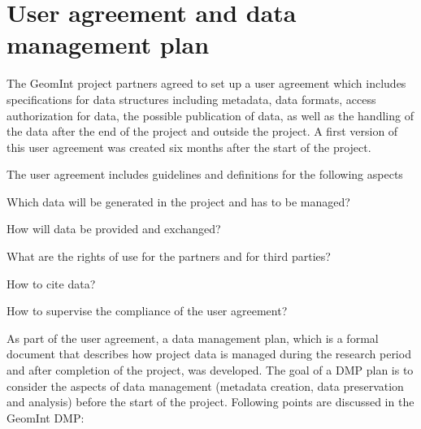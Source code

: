 
\section{User agreement and data management plan}

The GeomInt project partners agreed to set up a user agreement which includes specifications for data structures including metadata, data formats, access authorization for data, the possible publication of data, as well as the handling of the data after the end of the project and outside the project. A first version of this user agreement was created six months after the start of the project. 

The user agreement includes guidelines and definitions for the following aspects 

\begin{list}{-}{\leftmargin=1em \itemindent=0em \itemsep=0.1em}
\item Which data will be generated in the project and has to be managed?
\item How will data be provided and exchanged?
\item What are the rights of use for the partners and for third parties?
\item How to cite data?
\item How to supervise the compliance of the user agreement?
\end{list}

As part of the user agreement, a data management plan, which is a formal document that describes how project data is managed during the research period and after completion of the project, was developed. The goal of a DMP plan is to consider the aspects of data management (metadata creation, data preservation and analysis) before the start of the project. Following points are discussed in the GeomInt DMP:

